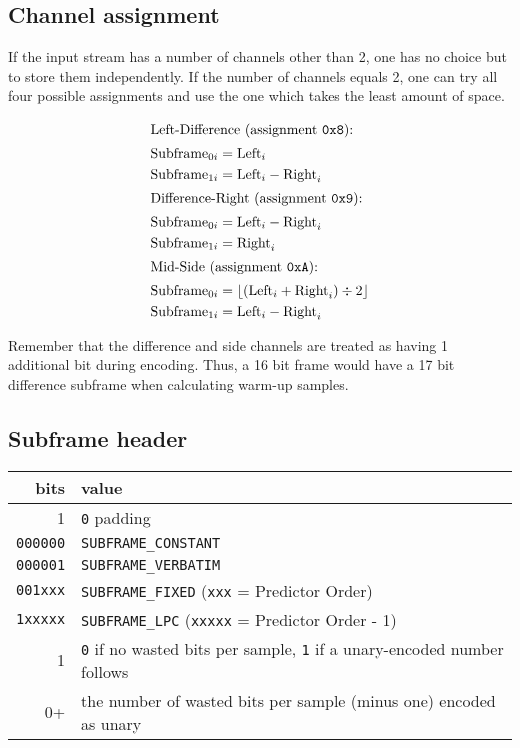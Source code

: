 \clearpage

\subsection{Channel assignment}

If the input stream has a number of channels other than 2,
one has no choice but to store them independently.
If the number of channels equals 2, one can try all four possible
assignments and use the one which takes the least amount of space.

\begin{align*}
\intertext{Left-Difference (assignment \texttt{0x8}):}
\text{Subframe}_{0i} &= \text{Left}_i \\
\text{Subframe}_{1i} &= \text{Left}_i - \text{Right}_i \\
\intertext{Difference-Right (assignment \texttt{0x9}):}
\text{Subframe}_{0i} &= \text{Left}_i - \text{Right}_i \\
\text{Subframe}_{1i} &= \text{Right}_i \\
\intertext{Mid-Side (assignment \texttt{0xA}):}
\text{Subframe}_{0i} &= \lfloor (\text{Left}_i + \text{Right}_i) \div 2 \rfloor \\
\text{Subframe}_{1i} &= \text{Left}_i - \text{Right}_i \\
\end{align*}
\par
\noindent
Remember that the difference and side channels are treated as having
1 additional bit during encoding.
Thus, a 16 bit frame would have a 17 bit difference subframe
when calculating warm-up samples.

\subsection{Subframe header}
\begin{tabular}{|r|l|}
\hline
bits & value \\
\hline
1 & \texttt{0} padding \\
\texttt{000000} & \texttt{SUBFRAME\_CONSTANT} \\
\texttt{000001} & \texttt{SUBFRAME\_VERBATIM} \\
\texttt{001xxx} & \texttt{SUBFRAME\_FIXED} (\texttt{xxx} = Predictor Order) \\
\texttt{1xxxxx} & \texttt{SUBFRAME\_LPC} (\texttt{xxxxx} = Predictor Order - 1) \\
1 & \texttt{0} if no wasted bits per sample, \texttt{1} if a unary-encoded number follows \\
0+ & the number of wasted bits per sample (minus one) encoded as unary \\
\hline
\end{tabular}

